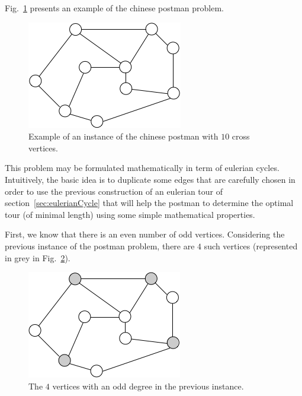 Fig.~\ref{fig:eulerianInitial} presents an example of the chinese postman problem. 
\begin{figure}[h]
\begin{center}
       \includegraphics[scale=0.6]{FiguresGraph/EulerienInitial}
       \caption{Example of an instance of the chinese postman with $10$ cross vertices.}
              \label{fig:eulerianInitial}
\end{center}
\end{figure}

\bigskip

This problem may be formulated mathematically in term of eulerian cycles.
Intuitively, the basic idea is to duplicate some edges that are carefully chosen in order to use the previous construction
of an eulerian tour of section~\ref{sec:eulerianCycle} that will help the postman to determine 
the optimal tour (of minimal length) using some simple mathematical properties. 
\bigskip

First, we know that there is an even number of odd vertices.
Considering the previous instance of the postman problem, there are $4$ such vertices (represented in grey in Fig.~\ref{fig:eulerianVodd}).

\begin{figure}[h]
\begin{center}
       \includegraphics[scale=0.6]{FiguresGraph/EulerienVodd}
       \caption{The $4$ vertices with an odd degree in the previous instance.}
              \label{fig:eulerianVodd}
\end{center}
\end{figure}
\bigskip

